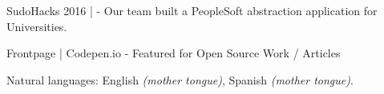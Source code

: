 \documentclass[10pt,a4paper]{article}
\begin{document}
\spacedhrule{0.5em}{-0.4em} %



\inlineheadsection %
{SudoHacks 2016 | }
{ - Our team built a PeopleSoft abstraction application for Universities.}


\inlineheadsection %
{Frontpage  | Codepen.io}
{ - Featured for Open Source Work / Articles}



\spacedhrule{1.6em}{-0.4em} %




 \inlineheadsection %
{Natural languages:}
{English \textit{(mother tongue)}, Spanish \textit{(mother tongue)}.}


\spacedhrule{1.6em}{-0.4em} %
\end{document}
